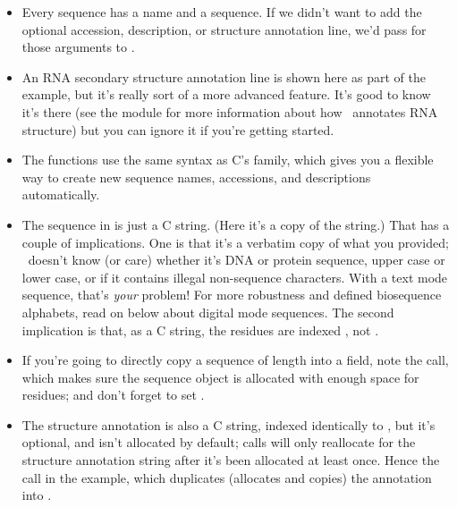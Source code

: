 \begin{itemize}
\item Every sequence has a name and a sequence. If we didn't want to
  add the optional accession, description, or structure annotation
  line, we'd pass  for those arguments to
  .

\item An RNA secondary structure annotation line is shown here as part
  of the example, but it's really sort of a more advanced
  feature. It's good to know it's there (see the  module
  for more information about how \Easel\ annotates RNA structure) but
  you can ignore it if you're getting started.

\item The  functions use the same syntax as C's
   family, which gives you a flexible way to create 
  new sequence names, accessions, and descriptions automatically.

\item The sequence in  is just a C string. (Here it's a
  copy of the  string.) That has a couple of
  implications. One is that it's a verbatim copy of what you provided;
  \Easel\ doesn't know (or care) whether it's DNA or protein sequence,
  upper case or lower case, or if it contains illegal non-sequence
  characters. With a text mode sequence, that's \emph{your} problem!
  For more robustness and defined biosequence alphabets, read on below
  about digital mode sequences. The second implication is that, as a C
  string, the  residues are indexed , not
  .

\item If you're going to directly copy a sequence of length 
  into a  field, note the 
  call, which makes sure the sequence object is allocated with enough
  space for  residues; and don't forget to set .

\item The structure annotation  is also a C string,
  indexed identically to , but it's optional, and isn't
  allocated by default;  calls will only
  reallocate for the structure annotation string after it's been
  allocated at least once.  Hence the  call in the
  example, which duplicates (allocates and copies) the annotation into
  .
\end{itemize}



